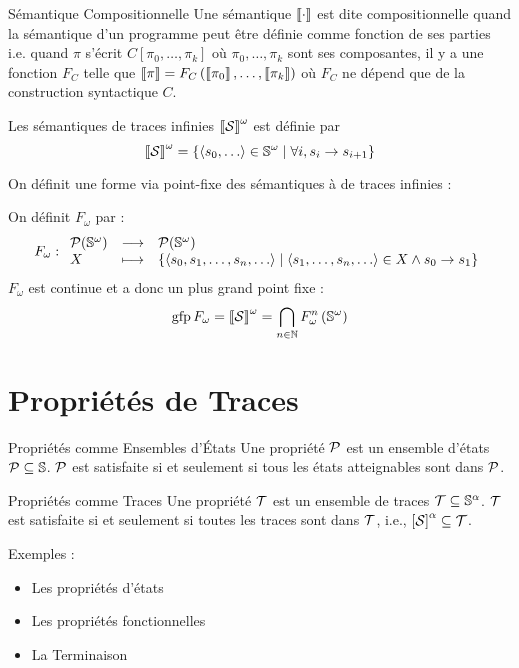 \documentclass{cours}
\begin{document}
\begin{définition}{Sémantique Compositionnelle}{}
    Une sémantique $\left\llbracket \cdot \right\rrbracket$ est dite compositionnelle quand la sémantique d'un programme peut être définie comme fonction de ses parties i.e. quand $\pi$ s'écrit $C\left[\pi_{0}, \ldots, \pi_{k}\right]$ où $\pi_{0}, \ldots, \pi_{k}$ sont ses composantes, il y a une fonction $F_{C}$ telle que $\left\llbracket \pi \right\rrbracket = F_{C}\left(\left\llbracket \pi_{0} \right\rrbracket, \ldots, \left\llbracket \pi_{k} \right\rrbracket\right)$ où $F_{C}$ ne dépend que de la construction syntactique $C$. 
\end{définition}

\begin{définition}{}{}
    Les sémantiques de traces infinies $\left\llbracket \mathcal{S} \right\rrbracket^{\omega}$ est définie par 
    \[
        \left\llbracket \mathcal{S} \right\rrbracket^{\omega} = \left\{\left\langle s_{0}, \ldots \right\rangle \in \mathbb{S}^{\omega}\mid \forall i, s_{i} \rightarrow s_{i + 1}\right\}
    \]
\end{définition}

On définit une forme via point-fixe des sémantiques à de traces infinies :
\begin{définition}{}{}
    On définit $F_{\omega}$ par : 
    \[
        F_{\omega} : \begin{array}{lcl}
            \mathcal{P}(\mathbb{S}^{\omega}) & \longrightarrow & \mathcal{P}(\mathbb{S}^{\omega})\\
            X & \longmapsto & \left\{\left\langle s_{0}, s_{1}, \ldots, s_{n}, \ldots \right\rangle \mid \left\langle s_{1}, \ldots, s_{n}, \ldots \right\rangle \in X \land s_{0} \to s_{1}\right\}            
        \end{array}
    \]
    $F_{\omega}$ est continue et a donc un plus grand point fixe : 
    \[
        \operatorname{gfp} F_{\omega} = \left\llbracket \mathcal{S} \right\rrbracket^{\omega} = \bigcap_{n \in \mathbb{N}} F_{\omega}^{n}\left(\mathbb{S}^{\omega}\right)
    \]
\end{définition}

\section{Propriétés de Traces}

\begin{définition}{Propriétés comme Ensembles d'États}{}
    Une propriété $\mathcal{P}$ est un ensemble d'états $\mathcal{P} \subseteq \mathbb{S}$. $\mathcal{P}$ est satisfaite si et seulement si tous les états atteignables sont dans $\mathcal{P}$. 
\end{définition}

\begin{définition}{Propriétés comme Traces}{}
    Une propriété $\mathcal{T}$ est un ensemble de traces $\mathcal{T} \subseteq \mathbb{S}^{\alpha}$. $\mathcal{T}$ est satisfaite si et seulement si toutes les traces sont dans $\mathcal{T}$, i.e., $\left[\mathcal{S}\right]^{\alpha} \subseteq \mathcal{T}$.
\end{définition}
Exemples : 
\begin{itemize}
    \item Les propriétés d'états
    \item Les propriétés fonctionnelles
    \item La Terminaison
\end{itemize}
\end{document}
